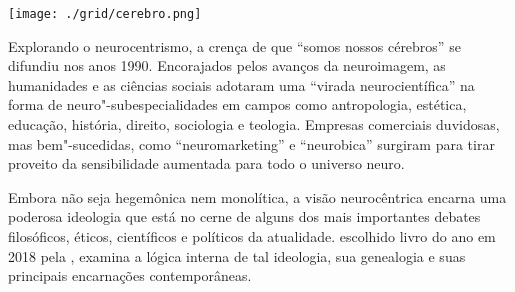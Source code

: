 \begin{center}
\hspace*{-3.6cm}
\hspace*{3.1cm}\texttt{[image: ./grid/cerebro.png]}
\end{center}

\hspace*{-7cm}\hrulefill\hspace*{-7cm}

\medskip

\noindent{}Explorando o neurocentrismo, a crença de que “somos nossos cérebros” se difundiu nos anos 1990. Encorajados pelos avanços da neuroimagem, as humanidades e as ciências sociais adotaram uma “virada neurocientífica” na forma de neuro"-subespecialidades em campos como antropologia, estética, educação, história, direito, sociologia e teologia. Empresas comerciais duvidosas, mas bem"-sucedidas, como “neuromarketing” e “neurobica” surgiram para tirar proveito da sensibilidade aumentada para todo o universo neuro.

Embora não seja hegemônica nem monolítica, a visão neurocêntrica encarna uma poderosa ideologia que está no cerne de alguns dos mais importantes debates filosóficos, éticos, científicos e políticos da atualidade. {} escolhido livro do ano em 2018 pela {}, examina a lógica interna de tal ideologia, sua genealogia e suas principais encarnações contemporâneas. 


\vfill

\hspace*{-.4cm}\begin{minipage}[c]{.5\linewidth}
\small{
{}}
\end{minipage}

\pagebreak %


